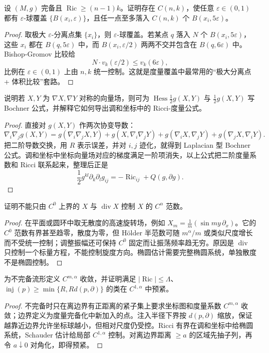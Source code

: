 \documentclass[11pt,a4paper,openany]{ctexbook}
\numberwithin{equation}{chapter}
\begin{document}
\begin{exercise}
设 \((M,g)\) 完备且 \(\operatorname{Ric}\ge(n-1)k\)。证明存在 \(C(n,k)\)，使任意 \(\varepsilon\in(0,1)\) 都有 \(\varepsilon\)-球覆盖 \(\{B(x_i,\varepsilon)\}\)，且任一点至多落入 \(C(n,k)\) 个 \(B(x_i,5\varepsilon)\)。
\end{exercise}
\begin{proof}
取极大 \(\varepsilon\)-分离点集 \(\{x_i\}\)，则 \(\varepsilon\)-球覆盖。若某点 \(q\) 落入 \(N\) 个 \(B(x_i,5\varepsilon)\)，这些 \(x_i\) 都在 \(B(q,5\varepsilon)\) 中，而 \(B(x_i,\varepsilon/2)\) 两两不交并包含在 \(B(q,6\varepsilon)\) 中。Bishop-Gromov 比较给
\[
N\cdot v_k(\varepsilon/2)\le v_k(6\varepsilon),
\]
比例在 \(\varepsilon\in(0,1)\) 上由 \(n,k\) 统一控制。这就是度量覆盖中最常用的“极大分离点 + 体积比较”套路。
\end{proof}

\begin{exercise}
说明若 \(X,Y\) 为 \(\nabla X,\nabla Y\) 对称的向量场，则可为 \(\operatorname{Hess}\frac12g(X,Y)\) 与 \(\frac12g(X,Y)\) 写 Bochner 公式，并解释它如何导出调和坐标中的 Ricci-度量公式。
\end{exercise}
\begin{proof}
直接对 \(g(X,Y)\) 作两次协变导数：
\[
\nabla_i\nabla_j g(X,Y)=g(\nabla_i\nabla_jX,Y)+g(X,\nabla_i\nabla_jY)
+g(\nabla_iX,\nabla_jY)+g(\nabla_jX,\nabla_iY).
\]
把二阶导数交换，用 \(R\) 表示误差，并对 \(i,j\) 迹化，就得到 Laplacian 型 Bochner 公式。调和坐标中坐标向量场对应的梯度满足一阶项消失，以上公式把二阶度量系数和 Ricci 联系起来，整理后正是
\[
\frac12 g^{kl}\partial_k\partial_l g_{ij}=-\operatorname{Ric}_{ij}+Q(g,\partial g).
\]
\end{proof}

\begin{exercise}
证明不能只由 \(C^0\) 上界的 \(X\) 与 \(\operatorname{div}X\) 控制 \(X\) 的 \(C^\alpha\) 范数。
\end{exercise}
\begin{proof}
在平面或圆环中取无散度的高速旋转场，例如 \(X_m=\frac1m(\sin my\,\partial_x)\)。它的 \(C^0\) 范数有界甚至趋零，散度为零，但 Hölder 半范数可随 \(m^\alpha/m\) 或类似尺度增长而不受统一控制；调整振幅还可保持 \(C^0\) 固定而让振荡频率趋无穷。原因是 \(\operatorname{div}\) 只控制一个标量方程，不能控制旋度方向。椭圆估计需要完整椭圆系统，单独散度不是椭圆控制。
\end{proof}

\begin{exercise}
为不完备流形定义 \(C^{m,\alpha}\) 收敛，并证明满足 \(|\operatorname{Ric}|\le\Lambda\)、\(\operatorname{inj}(p)\ge \min\{R,Rd(p,\partial)\}\) 的类在 \(C^{1,\alpha}\) 中预紧。
\end{exercise}
\begin{proof}
不完备时只在离边界有正距离的紧子集上要求坐标图和度量系数 \(C^{m,\alpha}\) 收敛；边界定义为度量完备化中新加入的点。注入半径下界按 \(d(p,\partial)\) 缩放，保证越靠近边界允许坐标球越小，但相对尺度仍受控。Ricci 有界在调和坐标中给椭圆系统，Schauder 估计给局部 \(C^{1,\alpha}\) 控制。对离边界距离 \(\ge a\) 的区域先抽子列，再令 \(a\downarrow0\) 对角化，即得预紧。
\end{proof}
\end{document}
